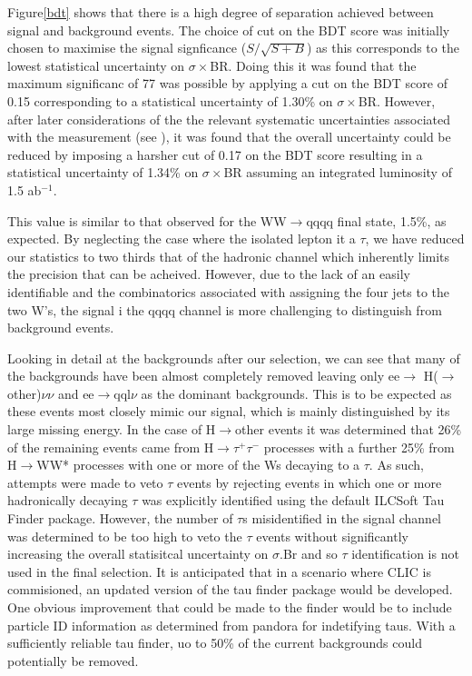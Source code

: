 Figure\ref{bdt} shows that there is a high degree of separation achieved between signal and background events.
The choice of cut on the BDT score was initially chosen to maximise the signal signficance ($S/\sqrt{S+B}$) as this corresponds to the lowest statistical uncertainty on $\sigma\times$BR. Doing this it was found that the maximum significanc of 77 was possible by applying a cut on the BDT score of 0.15 corresponding to a statistical uncertainty of 1.30\% on $\sigma\times$BR. However, after later considerations of the the relevant systematic uncertainties associated with the measurement (see ), it was found that the overall uncertainty could be reduced by imposing a harsher cut of 0.17 on the BDT score resulting in a statistical uncertainty of 1.34\% on $\sigma\times$BR assuming an integrated luminosity of 1.5 ab$^{-1}$.

This value is similar to that observed for the WW$\rightarrow$qqqq final state, 1.5\%, as expected. By neglecting the case where the isolated lepton it a $\tau$, we have reduced our statistics to two thirds that of the hadronic channel which inherently limits the precision that can be acheived. However, due to the lack of an easily identifiable and the combinatorics associated with assigning the four jets to the two W's, the signal i the qqqq channel is more challenging to distinguish from background events.

Looking in detail at the backgrounds after our selection, we can see that many of the backgrounds have been almost completely removed leaving only ee$\rightarrow$ H($\rightarrow$ other)$\nu\nu$ and ee$\rightarrow$qql$\nu$ as the dominant backgrounds. This is to be expected as these events most closely mimic our signal, which is mainly distinguished by its large missing energy. In the case of H$\rightarrow$other events it was determined that 26\% of the remaining events came from H$\rightarrow\tau^+\tau^-$ processes with a further 25\% from H$\rightarrow$WW* processes with one or more of the Ws decaying to a $\tau$. As such, attempts were made to veto $\tau$ events by rejecting events in which one or more hadronically decaying $\tau$ was explicitly identified using the default ILCSoft Tau Finder \cite{TauFinder} package. However, the number of $\tau$s misidentified in the signal channel was determined to be too high to veto the $\tau$ events without significantly increasing the overall statisitcal uncertainty on $\sigma.$Br and so $\tau$ identification is not used in the final selection. It is anticipated that in a scenario where \ac{CLIC} is commisioned, an updated version of the tau finder package would be developed. One obvious improvement that could be made to the finder would be to include particle ID information as determined from pandora for indetifying taus. With a sufficiently reliable tau finder, uo to 50\% of the current backgrounds could potentially be removed. 

